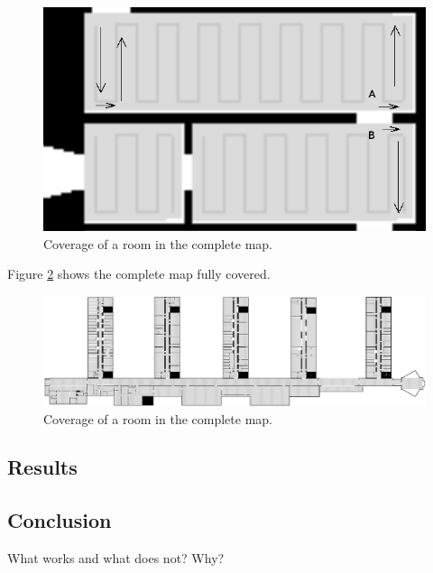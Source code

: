 \begin{figure}[H]
\centering
\includegraphics[scale=0.33]{img/room.png}
\caption{Coverage of a room in the complete map.}
\label{fig::room}
\end{figure}

Figure \ref{fig::coverage} shows the complete map fully covered.

\begin{figure}[H]
\centering
\includegraphics[scale=0.33]{img/coverage.png}
\caption{Coverage of a room in the complete map.}
\label{fig::coverage}
\end{figure}

\subsection{Results}

\subsection{Conclusion}
What works and what does not? Why?
